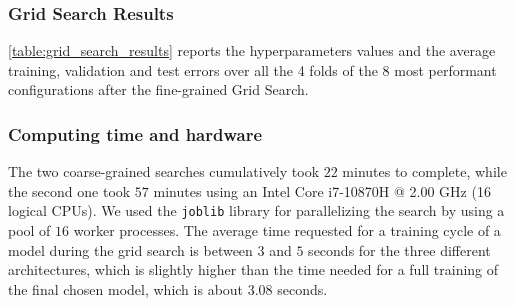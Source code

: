 \subsubsection{Grid Search Results}
\cref{table:grid_search_results} reports the hyperparameters values and the average training, validation and test errors over all the 4 folds of the 8 most performant configurations after the fine-grained Grid Search.

\begin{table}[htb]
    \centering
    \caption{Hyperparameters and average training, validation and test error of the 8 most performant configurations after last grid search}
    \label{table:grid_search_results}
\end{table}

\subsubsection{Computing time and hardware}
The two coarse-grained searches cumulatively took $22$ minutes to complete, while the second one took $57$ minutes using an Intel Core i7-10870H @ 2.00 GHz (16 logical CPUs). We used the \texttt{joblib} library for parallelizing the search by using a pool of $16$ worker processes. The average time requested for a training cycle of a model during the grid search is between $3$ and $5$ seconds for the three different architectures, which is slightly higher than the time needed for a full training of the final chosen model, which is about $3.08$ seconds.

